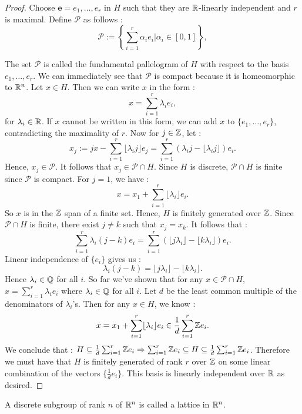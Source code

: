 \begin{proof}
  Choose $\mathbf{e}=e_1,\ldots, e_r$ in $H$ such that they are $\mathbb{R}$-linearly independent and $r$ is maximal. Define $\mathscr{P}$ as follows :
  \[\mathscr{P} := \left\{\sum_{i=1}^r \alpha_i e_i | \alpha_i \in [0,1]\right\},\]

  The set $\mathscr{P}$ is called the fundamental pallelogram of $H$ with respect to the basis $e_1, \ldots, e_r$. We can immediately see that $\mathscr{P}$ is compact because it is homeomorphic to $\mathbb{R}^n$.
  Let $x\in H$. Then we can write $x$ in the form :
  \[x = \sum_{i=1}^r \lambda_i e_i,\]
  for $\lambda_i \in \mathbb{R}$. If $x$ cannot be written in this form, we can add $x$ to $\{e_1,\ldots, e_r\}$, contradicting the maximality of $r$.
  Now for $j\in \mathbb{Z}$, let :
  \[x_j := jx - \sum_{i=1}^r \lfloor \lambda_i j\rfloor e_j = \sum_{i=1}^r (\lambda_i j - \lfloor\lambda_i j\rfloor)e_i \tag{$j\in \Z$}.\]
  Hence, $x_j\in \mathscr{P}$. It follows that $x_j \in \mathscr{P}\cap H$.
  Since $H$ is discrete, $\mathscr{P}\cap H$ is finite since $\mathscr{P}$ is compact. For $j=1$, we have :
  \[x = x_1 + \sum_{i=1}^r \lfloor \lambda_i \rfloor e_i.\]
  So $x$ is in the $\mathbb{Z}$ span of a finite set. Hence, $H$ is finitely generated over $\mathbb{Z}$. Since $\mathscr{P}\cap H$ is finite, there exist $j\neq k$ such that $x_j = x_k$. It follows that :
  \[\sum_{i=1}^r \lambda_i (j-k)e_i = \sum_{i=1}^r (\lfloor j\lambda_i\rfloor - \lfloor k\lambda_i\rfloor)e_i.\]
  Linear independence of $\{e_i\}$ gives us :
  \[\lambda_i (j-k)=\lfloor j\lambda_i\rfloor - \lfloor k\lambda_i\rfloor.\]
  Hence $\lambda_i \in \mathbb{Q}$ for all $i$. So far we've shown that for any $x\in \mathscr{P}\cap H$, $x=\sum_{i=1}^r \lambda_i e_i$ where $\lambda_i\in \mathbb{Q}$ for all $i$. Let $d$ be the least common multiple of the denominators of $\lambda_i$'s. Then for any $x\in H$, we know :
  \[x = x_1+\sum_{i=1}^r \lfloor \lambda_i \rfloor e_i \in \frac{1}{d}\sum_{i=1}^r \mathbb{Z} e_i.\] We conclude that :
  $H \subseteq \frac{1}{d}\sum_{i=1}^r \mathbb{Z} e_i \Rightarrow \sum_{i=1}^r \mathbb{Z} e_i \subseteq H \subseteq \frac{1}{d}\sum_{i=1}^r\mathbb{Z} e_i$. Therefore we must have that $H$ is finitely generated of rank $r$ over $\mathbb{Z}$ on some linear combination of the vectors $\{\frac{1}{d}e_i\}$. This basis is linearly independent over $\mathbb{R}$ as desired.
\end{proof}

\begin{definition}[Lattice]
  A discrete subgroup of rank $n$ of $\mathbb{R}^n$ is called a lattice in $\mathbb{R}^n$.
\end{definition}

